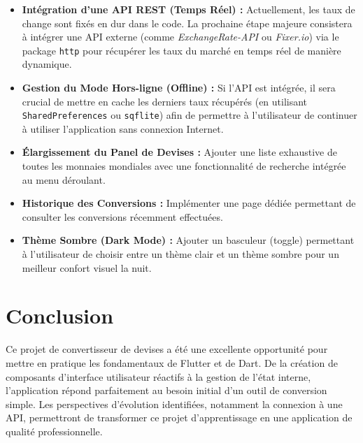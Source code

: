 \documentclass[12pt,a4paper]{article}
\begin{document}
\begin{itemize}
    \item \textbf{Intégration d'une API REST (Temps Réel) :} Actuellement, les taux de change sont fixés en dur dans le code. La prochaine étape majeure consistera à intégrer une API externe (comme \textit{ExchangeRate-API} ou \textit{Fixer.io}) via le package \texttt{http} pour récupérer les taux du marché en temps réel de manière dynamique.
    \item \textbf{Gestion du Mode Hors-ligne (Offline) :} Si l'API est intégrée, il sera crucial de mettre en cache les derniers taux récupérés (en utilisant \texttt{SharedPreferences} ou \texttt{sqflite}) afin de permettre à l'utilisateur de continuer à utiliser l'application sans connexion Internet.
    \item \textbf{Élargissement du Panel de Devises :} Ajouter une liste exhaustive de toutes les monnaies mondiales avec une fonctionnalité de recherche intégrée au menu déroulant.
    \item \textbf{Historique des Conversions :} Implémenter une page dédiée permettant de consulter les conversions récemment effectuées.
    \item \textbf{Thème Sombre (Dark Mode) :} Ajouter un basculeur (toggle) permettant à l'utilisateur de choisir entre un thème clair et un thème sombre pour un meilleur confort visuel la nuit.
\end{itemize}

\section{Conclusion}

Ce projet de convertisseur de devises a été une excellente opportunité pour mettre en pratique les fondamentaux de Flutter et de Dart. De la création de composants d'interface utilisateur réactifs à la gestion de l'état interne, l'application répond parfaitement au besoin initial d'un outil de conversion simple. Les perspectives d'évolution identifiées, notamment la connexion à une API, permettront de transformer ce projet d'apprentissage en une application de qualité professionnelle.
\end{document}
